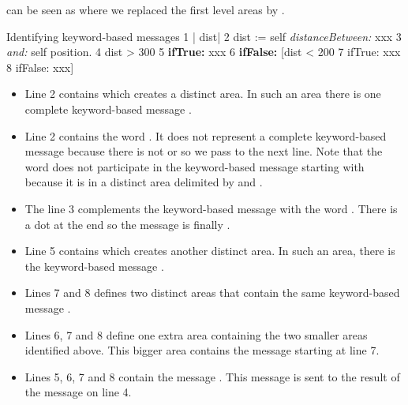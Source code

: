  can be seen as  where we replaced the first level areas by . 

\begin{scriptwithtitle}{Identifying keyword-based messages}\label{scr:keywordComplex2}
1   | dist| 
2   dist := self \textit{distanceBetween:} xxx
3                \textit{and:} self position.
4   dist > 300
5      \textbf{ifTrue:} xxx
6      \textbf{ifFalse:} [dist < 200
7         ifTrue: xxx
8         ifFalse: xxx]
\end{scriptwithtitle}

\begin{itemize}
\item Line 2 contains  which creates a distinct area. In such an area there is one complete keyword-based message . 

\item Line 2 contains the word . It does not represent a complete keyword-based message because there is not  or \ct{;} so we pass to the next line. Note that the word  does not participate in the keyword-based message starting with  because it is in a distinct area delimited by \ct{(} and \ct{)}.

\item The line 3 complements the keyword-based message with  the word . There is a dot at the end so the message is finally . 

\item Line 5 contains  which creates another distinct area. In such an area, there is the keyword-based message . 

\item Lines 7 and 8 defines two distinct areas that contain the same keyword-based message . 

\item Lines 6, 7 and 8 define one extra area  containing the two smaller areas identified above. This bigger area contains the message  starting at line 7.

\item Lines 5, 6, 7 and 8 contain the message . This message is sent to the result of the message  on line 4.
\end{itemize}

